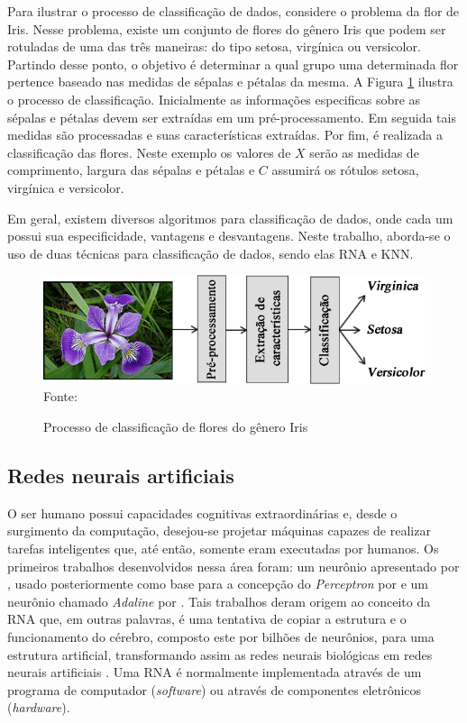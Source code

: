 Para ilustrar o processo de classificação de dados, considere o problema da flor de Iris. Nesse problema, existe um conjunto de flores do gênero Iris que podem ser rotuladas de uma das três maneiras: do tipo setosa, virgínica ou versicolor. Partindo desse ponto, o objetivo é determinar a qual grupo uma determinada flor pertence baseado nas medidas de sépalas e pétalas da mesma. A Figura \ref{fig:irisExample} ilustra o processo de classificação. Inicialmente as informações especificas sobre as sépalas e pétalas devem ser extraídas em um pré-processamento. Em seguida tais medidas são processadas e suas características extraídas. Por fim, é realizada a classificação das flores. Neste exemplo os valores de $X$ serão as medidas de comprimento, largura das sépalas e pétalas e $C$ assumirá os rótulos setosa, virgínica e versicolor.

Em geral, existem diversos algoritmos para classificação de dados, onde cada um possui sua especificidade, vantagens e desvantagens. Neste trabalho, aborda-se o uso de duas técnicas para classificação de dados, sendo elas RNA e KNN.

\begin{figure}[ht!]
\caption{Processo de classificação de flores do gênero Iris}
\label{fig:irisExample}
\centering
\includegraphics[scale=0.65]{img/irisExample.png}
{\fontsize{11pt}{\baselineskip}\selectfont
\\Fonte: \cite{pacheco2016agregaccao}
}
\end{figure}

\subsection{Redes neurais artificiais}
O ser humano possui capacidades cognitivas extraordinárias e, desde o surgimento da computação, desejou-se projetar máquinas capazes de realizar tarefas inteligentes que, até então, somente eram  executadas por humanos. Os primeiros trabalhos desenvolvidos nessa área foram: um neurônio apresentado por \cite{mcculloch1943logical}, usado posteriormente como base para a concepção do  \textit{Perceptron} por \cite{rosenblatt1958perceptron} e um neurônio chamado \textit{Adaline} por \cite{widrow1960adaptive}. Tais trabalhos deram origem ao conceito da RNA que, em outras palavras, é uma tentativa de copiar a estrutura e o funcionamento do cérebro, composto este por bilhões de neurônios, para uma estrutura artificial, transformando assim as redes neurais biológicas em redes neurais artificiais \citep{Rauber2005}. Uma RNA é normalmente implementada através de um programa de computador (\textit{software}) ou através de componentes eletrônicos (\textit{hardware}).

